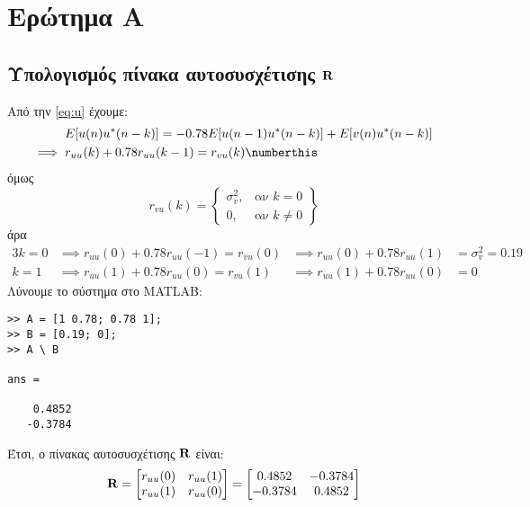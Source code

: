 \section{Ερώτημα Α}
\subsection{Υπολογισμός πίνακα αυτοσυσχέτισης $\mathbf{R}$}
Από την \eqref{eq:u} έχουμε:
\begin{align*}
&E[u(n) u^*(n-k)] = -0.78E[u(n-1) u^*(n-k)] + E[v(n) u^*(n-k)]\\
\implies{}&r_{uu}(k) + 0.78r_{uu}(k-1) = r_{vu}(k)
\numberthis
\end{align*}
όμως
\begin{equation}
r_{vu}(k) = \left\{
    \begin{array}{lr}
        \sigma_v^2,& \text{αν }k = 0\\
        0,& \text{αν }k \neq 0
    \end{array}
\right\}
\end{equation}
άρα
\begin{alignat}{3}
k = 0 &\implies r_{uu}(0) + 0.78r_{uu}(-1) = r_{vu}(0) &\implies r_{uu}(0) + 0.78r_{uu}(1) &= \sigma_v^2 = 0.19\\
k = 1 &\implies r_{uu}(1) + 0.78r_{uu}(0) = r_{vu}(1) &\implies r_{uu}(1) + 0.78r_{uu}(0) &= 0
\end{alignat}
Λύνουμε το σύστημα στο MATLAB:
\begin{lstlisting}[caption={Επίλυση συστήματος στο MATLAB}]
>> A = [1 0.78; 0.78 1];
>> B = [0.19; 0];
>> A \ B

ans =

    0.4852
   -0.3784
\end{lstlisting}
Έτσι, ο πίνακας αυτοσυσχέτισης $\mathbf{R}$ είναι:
\begin{equation}
\mathbf{R} = \begin{bmatrix}
    r_{uu}(0) & r_{uu}(1)\\
    r_{uu}(1) & r_{uu}(0)
\end{bmatrix} =
\begin{bmatrix}
    0.4852 & -0.3784\\
    -0.3784 & 0.4852
\end{bmatrix}
\end{equation}


